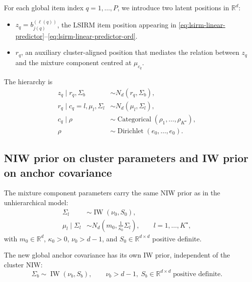 \documentclass[11pt]{article}
\newcommand{\R}{\mathbb R}
\DeclareMathOperator{\Cat}{Categorical}
\DeclareMathOperator{\Dir}{Dirichlet}
\DeclareMathOperator{\IW}{IW}
\begin{document}
For each global item index $q=1,\dots,P$, we introduce two latent positions
in $\R^d$:
\begin{itemize}[leftmargin=1.5em]
    \item $z_q=b_{j(q)}^{(\ell(q))}$, the LSIRM item position appearing in
    \eqref{eq:lsirm-linear-predictor}--\eqref{eq:lsirm-linear-predictor-ord}.
    \item $r_q$, an auxiliary cluster-aligned position that mediates the
    relation between $z_q$ and the mixture component centred at $\mu_{c_q}$.
\end{itemize}

The hierarchy is
\begin{align}
    z_q\mid r_q,\Sigma_b
    &\sim N_d(r_q,\Sigma_b),
    \label{eq:z-given-r}\\
    r_q\mid c_q=l,\mu_l,\Sigma_l
    &\sim N_d(\mu_l,\Sigma_l),
    \label{eq:r-given-cluster}\\
    c_q\mid \rho
    &\sim \Cat(\rho_1,\dots,\rho_{K^\star}),\\
    \rho
    &\sim \Dir(e_0,\dots,e_0).
    \label{eq:rho-prior}
\end{align}

\subsection{NIW prior on cluster parameters and IW prior on anchor covariance}

The mixture component parameters carry the same NIW prior as in the
unhierarchical model:
\begin{align}
    \Sigma_l
    &\sim \IW(\nu_0,S_0),
    \label{eq:sigma-niw-prior}\\
    \mu_l\mid \Sigma_l
    &\sim N_d\!\left(m_0,\frac{1}{\kappa_0}\Sigma_l\right),
    \qquad l=1,\dots,K^\star,
    \label{eq:mu-niw-prior}
\end{align}
with $m_0\in\R^d$, $\kappa_0>0$, $\nu_0>d-1$, and $S_0\in\R^{d\times d}$
positive definite.

The new global anchor covariance has its own IW prior, independent of the
cluster NIW:
\begin{equation}
    \Sigma_b\sim\IW(\nu_b,S_b),
    \qquad \nu_b>d-1,\;S_b\in\R^{d\times d}\;\text{positive definite}.
    \label{eq:sigma-b-prior}
\end{equation}
\end{document}
